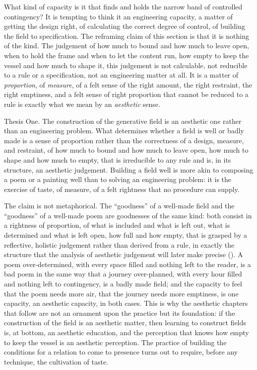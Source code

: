 What kind of capacity is it that finds and holds the narrow band of controlled contingency? It is tempting to think it an engineering capacity, a matter of getting the design right, of calculating the correct degree of control, of building the field to specification. The reframing claim of this section is that it is nothing of the kind. The judgement of how much to bound and how much to leave open, when to hold the frame and when to let the content run, how empty to keep the vessel and how much to shape it, this judgement is not calculable, not reducible to a rule or a specification, not an engineering matter at all. It is a matter of \emph{proportion}, of \emph{measure}, of a felt sense of the right amount, the right restraint, the right emptiness, and a felt sense of right proportion that cannot be reduced to a rule is exactly what we mean by an \emph{aesthetic} sense.

\begin{thesis}{Thesis One.}
The construction of the generative field is an aesthetic one rather than an engineering problem. What determines whether a field is well or badly made is a sense of proportion rather than the correctness of a design, measure, and restraint, of how much to bound and how much to leave open, how much to shape and how much to empty, that is irreducible to any rule and is, in its structure, an aesthetic judgement. Building a field well is more akin to composing a poem or a painting well than to solving an engineering problem: it is the exercise of taste, of measure, of a felt rightness that no procedure can supply.
\end{thesis}

\noindent
The claim is not metaphorical. The ``goodness'' of a well-made field and the ``goodness'' of a well-made poem are goodnesses of the same kind: both consist in a rightness of proportion, of what is included and what is left out, what is determined and what is left open, how full and how empty, that is grasped by a reflective, holistic judgement rather than derived from a rule, in exactly the structure that the analysis of aesthetic judgement will later make precise (). A poem over-determined, with every space filled and nothing left to the reader, is a bad poem in the same way that a journey over-planned, with every hour filled and nothing left to contingency, is a badly made field; and the capacity to feel that the poem needs more air, that the journey needs more emptiness, is one capacity, an aesthetic capacity, in both cases. This is why the aesthetic chapters that follow are not an ornament upon the practice but its foundation: if the construction of the field is an aesthetic matter, then learning to construct fields is, at bottom, an aesthetic education, and the perception that knows how empty to keep the vessel is an aesthetic perception. The practice of building the conditions for a relation to come to presence turns out to require, before any technique, the cultivation of taste.

